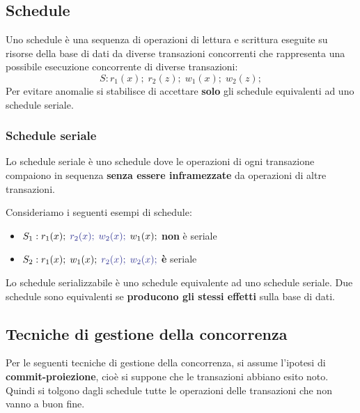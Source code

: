 \documentclass[a4paper]{article}
\begin{document}
\subsection{Schedule}
Uno schedule è una sequenza di operazioni di lettura e scrittura eseguite su risorse
della base di dati da diverse transazioni concorrenti che rappresenta una possibile
esecuzione concorrente di diverse transazioni:
\[
  S: r_1(x); \; r_2(z); \; w_1(x); \; w_2(z);
\] 
Per evitare anomalie si stabilisce di accettare \textbf{solo} gli schedule equivalenti
ad uno schedule seriale.

\subsubsection{Schedule seriale}
Lo schedule seriale è uno schedule dove le operazioni di ogni
transazione compaiono in sequenza \textbf{senza essere inframezzate} da operazioni
di altre transazioni.
\begin{example}
  Consideriamo i seguenti esempi di schedule:
  \begin{itemize}
    \item \( S_1: r_1(x); \; \color{Blue}r_2(x); \; w_2(x); \; \color{black}w_1(x); \)
      \textbf{non} è seriale

    \item \( S_2: r_1(x); \; w_1(x); \; \color{Blue} r_2(x); \; w_2(x); \) 
      \textbf{è} seriale
  \end{itemize}
\end{example}

\begin{definition}
  Lo schedule serializzabile è uno schedule equivalente ad uno schedule
  seriale. Due schedule sono equivalenti se \textbf{producono gli stessi effetti}
  sulla base di dati.
\end{definition}

\subsection{Tecniche di gestione della concorrenza}
Per le seguenti tecniche di gestione della concorrenza, si assume l'ipotesi di
\textbf{commit-proiezione}, cioè si suppone che le transazioni abbiano esito noto.
Quindi si tolgono dagli schedule tutte le operazioni delle transazioni che non vanno
a buon fine.
\end{document}
